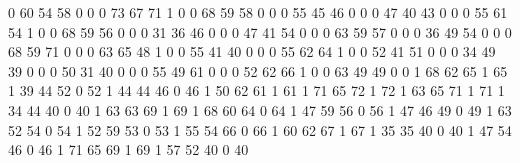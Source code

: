 \documentclass[a4paper,10pt]{article}
\begin{document}
\begin{eulernotebook}
\begin{eulercomment}
\begin{eulercomment}
\begin{eulercomment}
\begin{eulercomment}
\begin{eulercomment}
\begin{eulercomment}
\begin{eulercomment}
\begin{eulercomment}
\begin{euleroutput}
           0        60        54        58         0           0
           0        73        67        71         1           0
           0        68        59        58         0           0
           0        55        45        46         0           0
           0        47        40        43         0           0
           0        55        61        54         1           0
           0        68        59        56         0           0
           0        31        36        46         0           0
           0        47        41        54         0           0
           0        63        59        57         0           0
           0        36        49        54         0           0
           0        68        59        71         0           0
           0        63        65        48         1           0
           0        55        41        40         0           0
           0        55        62        64         1           0
           0        52        41        51         0           0
           0        34        49        39         0           0
           0        50        31        40         0           0
           0        55        49        61         0           0
           0        52        62        66         1           0
           0        63        49        49         0           0
           1        68        62        65         1          65
           1        39        44        52         0          52
           1        44        44        46         0          46
           1        50        62        61         1          61
           1        71        65        72         1          72
           1        63        65        71         1          71
           1        34        44        40         0          40
           1        63        63        69         1          69
           1        68        60        64         0          64
           1        47        59        56         0          56
           1        47        46        49         0          49
           1        63        52        54         0          54
           1        52        59        53         0          53
           1        55        54        66         0          66
           1        60        62        67         1          67
           1        35        35        40         0          40
           1        47        54        46         0          46
           1        71        65        69         1          69
           1        57        52        40         0          40

\end{euleroutput}
\end{eulercomment}
\end{eulercomment}
\end{eulercomment}
\end{eulercomment}
\end{eulercomment}
\end{eulercomment}
\end{eulercomment}
\end{eulercomment}
\end{eulernotebook}
\end{document}
